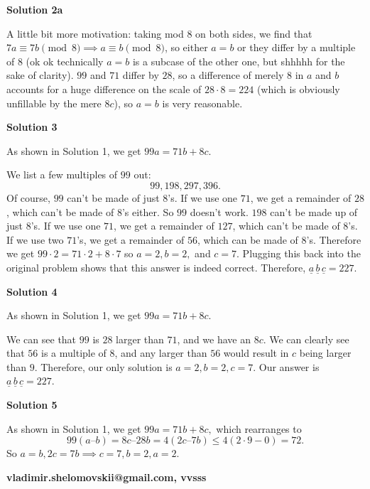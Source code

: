 \begin{enumerate}
 



\textbf{Solution 2a}

A little bit more motivation: taking mod $8$ on both sides, we find that $7a\equiv7b\pmod8\implies a\equiv b\pmod8$, so either $a=b$ or they differ by a multiple of $8$ (ok ok technically $a=b$ is a subcase of the other one, but shhhhh for the sake of clarity). $99$ and $71$ differ by $28$, so a difference of merely $8$ in $a$ and $b$ accounts for a huge difference on the scale of $28\cdot8=224$ (which is obviously unfillable by the mere $8c$), so $a=b$ is very reasonable. 

 



\textbf{Solution 3}

As shown in Solution 1, we get $99a = 71b+8c.$

 We list a few multiples of $99$ out: 
 \[99,198,297,396.\]Of course, $99$ can't be made of just $8$'s. If we use one $71$, we get a remainder of $28$, which can't be made of $8$'s either. So $99$ doesn't work. $198$ can't be made up of just $8$'s. If we use one $71$, we get a remainder of $127$, which can't be made of $8$'s. If we use two $71$'s, we get a remainder of $56$, which can be made of $8$'s. Therefore we get $99\cdot2=71\cdot2+8\cdot7$ so $a=2,b=2,$ and $c=7$. Plugging this back into the original problem shows that this answer is indeed correct. Therefore, $\underline{a}\,\underline{b}\,\underline{c}=\boxed{227}.$




\textbf{Solution 4}

As shown in Solution 1, we get $99a = 71b+8c$.

 We can see that $99$ is $28$ larger than $71$, and we have an $8c$. We can clearly see that $56$ is a multiple of $8$, and any larger than $56$ would result in $c$ being larger than $9$. Therefore, our only solution is $a = 2, b = 2, c = 7$. Our answer is $\underline{a}\,\underline{b}\,\underline{c}=\boxed{227}$.

 



\textbf{Solution 5}

As shown in Solution 1, we get $99a = 71b+8c,$ which rearranges to 
 \[99(a – b) = 8c – 28 b = 4(2c – 7b) \le 4(2\cdot 9 - 0 ) = 72.\]So $a=b, 2c = 7b \implies c=7, b=2,a=2.$

 \textbf{vladimir.shelomovskii@gmail.com, vvsss}

 




\end{enumerate}
